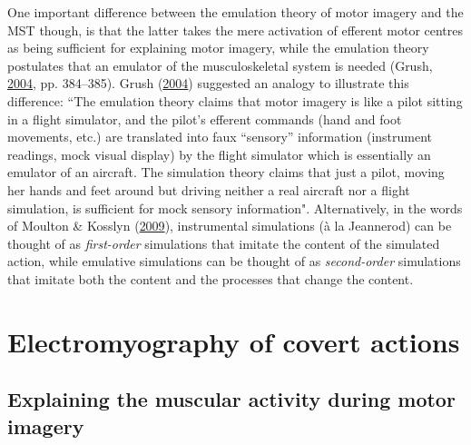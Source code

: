 \documentclass[a4paper,12pt,twoside,openright,oldfontcommands]{memoir}
\begin{document}
One important difference between the emulation theory of motor imagery and the MST though, is that the latter takes the mere activation of efferent motor centres as being sufficient for explaining motor imagery, while the emulation theory postulates that an emulator of the musculoskeletal system is needed (Grush, \protect\hyperlink{ref-grush_emulation_2004}{2004}, pp. 384--385). Grush (\protect\hyperlink{ref-grush_emulation_2004}{2004}) suggested an analogy to illustrate this difference: \enquote{The emulation theory claims that motor imagery is like a pilot sitting in a flight simulator, and the pilot's efferent commands (hand and foot movements, etc.) are translated into faux ``sensory} information (instrument readings, mock visual display) by the flight simulator which is essentially an emulator of an aircraft. The simulation theory claims that just a pilot, moving her hands and feet around but driving neither a real aircraft nor a flight simulation, is sufficient for mock sensory information". Alternatively, in the words of Moulton \& Kosslyn (\protect\hyperlink{ref-moulton_imagining_2009}{2009}), instrumental simulations (à la Jeannerod) can be thought of as \emph{first-order} simulations that imitate the content of the simulated action, while emulative simulations can be thought of as \emph{second-order} simulations that imitate both the content and the processes that change the content.

\hypertarget{electromyography-of-covert-actions}{%
\section{Electromyography of covert actions}\label{electromyography-of-covert-actions}}

\hypertarget{explaining-the-muscular-activity-during-motor-imagery}{%
\subsection{Explaining the muscular activity during motor imagery}\label{explaining-the-muscular-activity-during-motor-imagery}}
\end{document}
